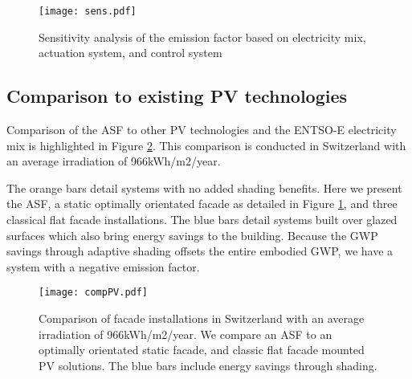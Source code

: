 \begin{figure}[H]
\begin{center}
\texttt{[image: sens.pdf]}
\caption{Sensitivity analysis of the emission factor based on electricity mix, actuation system, and control system}
\label{fig:sens}
\end{center}
\end{figure}

\subsection{Comparison to existing PV technologies}

Comparison of the ASF to other PV technologies and the ENTSO-E electricity mix is highlighted in Figure \ref{fig:compPV}. This comparison is conducted in Switzerland with an average irradiation of 966kWh/m$2$/year.\

The orange bars detail systems with no added shading benefits. Here we present the ASF, a static optimally orientated facade as detailed in Figure \ref{fig:sens}, and three classical flat facade installations.  
The blue bars detail systems built over glazed surfaces which also bring energy savings to the building. Because the GWP savings through adaptive shading offsets the entire embodied GWP, we have a system with a negative emission factor.




\begin{figure}[H]
\begin{center}
\texttt{[image: compPV.pdf]}
\caption{Comparison of facade installations in Switzerland with an average irradiation of 966kWh/m2/year.
We compare an ASF to an optimally orientated static facade, and classic flat facade mounted PV solutions. The blue bars include energy savings through shading.}
\label{fig:compPV}
\end{center}
\end{figure}

